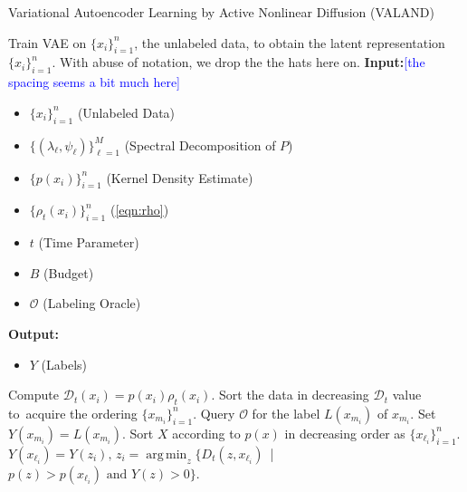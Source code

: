 \documentclass{article}
\def\hx{{\hat x}}
\newcommand{\Dt}{\mathcal{D}_{t}}
\DeclareMathOperator*{\argmin}{arg\,min}
\newcommand{\JMM}[1]{{\textcolor{blue}{[#1]}}}
\begin{document}
\begin{algorithm}[!htb]
	\caption{\label{alg:VALAND}Variational Autoencoder Learning by Active Nonlinear Diffusion (VALAND)}
	\flushleft
	Train VAE on $\{x_{i}\}_{i=1}^{n}$, the unlabeled data, to obtain the latent representation $\{\hx_{i}\}_{i=1}^{n}$. With abuse of notation, we drop the the hats here on.
	\flushleft
	\textbf{Input:}\JMM{the spacing seems a bit much here}
	\begin{itemize}
	\item $\{x_{i}\}_{i=1}^{n}$ (Unlabeled Data)\\
	 \item $\{(\lambda_{\ell},\psi_{\ell})\}_{\ell=1}^{M}$ (Spectral Decomposition of $P$)\\
	 \item $\{p(x_{i})\}_{i=1}^{n}$ (Kernel Density Estimate)\\
	 \item $\{\rho_{t}(x_{i})\}_{i=1}^{n}$ (\ref{eqn:rho})\\
	 \item $t$ (Time Parameter)\\
	 \item $B$ (Budget)\\
	 \item $\mathcal{O}$ (Labeling Oracle)\\
	  \end{itemize}
	\textbf{Output:} 
	\begin{itemize}
	\item $Y$ (Labels)
	\end{itemize}
	\begin{algorithmic}[1]
	\STATE Compute $\Dt(x_{i})=p(x_{i})\rho_{t}(x_{i})$.  
	\STATE Sort the data in decreasing $\Dt$ value to\ 
	acquire the ordering $\{x_{m_{i}}\}_{i=1}^{n}$.
	\STATE Query $\mathcal{O}$ for the label $L(x_{m_{i}})$ of $x_{m_{i}}$.
	\STATE Set $Y(x_{m_{i}})=L(x_{m_{i}})$.
	\ENDFOR
	\STATE Sort $X$ according to $p(x)$ in decreasing order as $\{x_{\ell_{i}}\}_{i=1}^{n}$.  
	\FOR{$i=1:n$}
	\STATE $Y(x_{\ell_{i}})=Y(z_{i}), \, z_{i}=\displaystyle\argmin_{z}\{D_{t}(z,x_{\ell_{i}})$\ | \ $p(z)>p(x_{\ell_{i}}) \text{ and } Y(z)>0\}$.
	\ENDIF
	\ENDFOR
	\end{algorithmic}
\end{algorithm}
\end{document}
